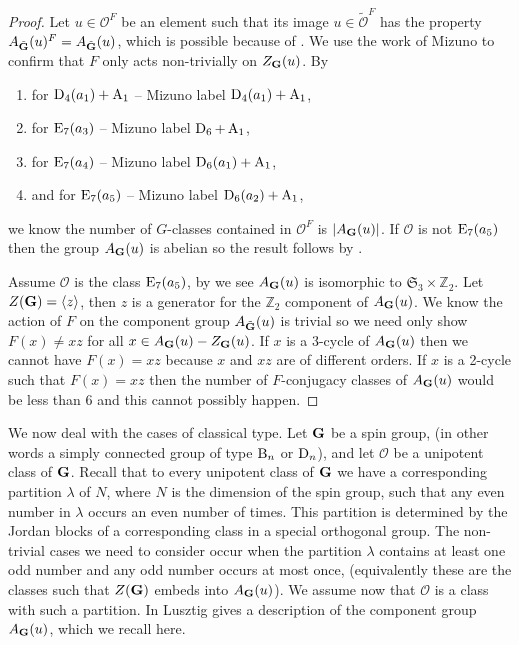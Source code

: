 \documentclass{jt-calcs}
\renewcommand{\cref}{\Cref}
\begin{document}
\begin{proof}
Let $u \in \mathcal{O}^F$ be an element such that its image $u \in \mathcal{\tilde{O}}^F$ has the property $A_{\tilde{\mathbf{G}}}(u)^F = A_{\tilde{\mathbf{G}}}(u)$, which is possible because of \cref{thm:triv-comp-action-adj}. We use the work of Mizuno \cite{mizuno:1980:conjugacy-classes-of-E7-and-E8} to confirm that $F$ only acts non-trivially on $Z_{\mathbf{G}}(u)$. By
\begin{enumerate}
	\item \cite[Lemma 30]{mizuno:1980:conjugacy-classes-of-E7-and-E8} for $\operatorname{D}_4(a_1)+\operatorname{A}_1$ -- Mizuno label $\operatorname{D}_4(a_1)+\operatorname{A}_1$,
	\item \cite[Lemma 13]{mizuno:1980:conjugacy-classes-of-E7-and-E8} for $\operatorname{E}_7(a_3)$ -- Mizuno label $\operatorname{D}_6+\operatorname{A}_1$,
	\item \cite[Lemma 17]{mizuno:1980:conjugacy-classes-of-E7-and-E8} for $\operatorname{E}_7(a_4)$ -- Mizuno label $\operatorname{D}_6(a_1)+\operatorname{A}_1$,
	\item and \cite[Lemma 21(2)]{mizuno:1980:conjugacy-classes-of-E7-and-E8} for $\operatorname{E}_7(a_5)$ -- Mizuno label $\operatorname{D}_6(a_2)+\operatorname{A}_1$,
\end{enumerate}
we know the number of $G$-classes contained in $\mathcal{O}^F$ is $|A_{\mathbf{G}}(u)|$. If $\mathcal{O}$ is not $\operatorname{E}_7(a_5)$ then the group $A_{\mathbf{G}}(u)$ is abelian so the result follows by \cref{lem:abelian-comp-group}.

Assume $\mathcal{O}$ is the class $\operatorname{E}_7(a_5)$, by \cite[Table 9]{mizuno:1980:conjugacy-classes-of-E7-and-E8} we see $A_{\mathbf{G}}(u)$ is isomorphic to $\mathfrak{S}_3 \times \mathbb{Z}_2$. Let $Z(\mathbf{G}) = \langle z \rangle$, then $z$ is a generator for the $\mathbb{Z}_2$ component of $A_{\mathbf{G}}(u)$. We know the action of $F$ on the component group $A_{\tilde{\mathbf{G}}}(u)$ is trivial so we need only show $F(x) \neq xz$ for all $x \in A_{\mathbf{G}}(u) - Z_{\mathbf{G}}(u)$. If $x$ is a 3-cycle of $A_{\mathbf{G}}(u)$ then we cannot have $F(x) = xz$ because $x$ and $xz$ are of different orders. If $x$ is a 2-cycle such that $F(x) = xz$ then the number of $F$-conjugacy classes of $A_{\mathbf{G}}(u)$ would be less than 6 and this cannot possibly happen.
\end{proof}

We now deal with the cases of classical type. Let $\mathbf{G}$ be a spin group, (in other words a simply connected group of type $\operatorname{B}_n$ or $\operatorname{D}_n$), and let $\mathcal{O}$ be a unipotent class of $\mathbf{G}$. Recall that to every unipotent class of $\mathbf{G}$ we have a corresponding partition $\lambda$ of $N$, where $N$ is the dimension of the spin group, such that any even number in $\lambda$ occurs an even number of times. This partition is determined by the Jordan blocks of a corresponding class in a special orthogonal group. The non-trivial cases we need to consider occur when the partition $\lambda$ contains at least one odd number and any odd number occurs at most once, (equivalently these are the classes such that $Z(\mathbf{G})$ embeds into $A_{\mathbf{G}}(u)$). We assume now that $\mathcal{O}$ is a class with such a partition. In \cite[\S 14.3]{lusztig:1984:intersection-cohomology-complexes} Lusztig gives a description of the component group $A_{\mathbf{G}}(u)$, which we recall here.
\end{document}
